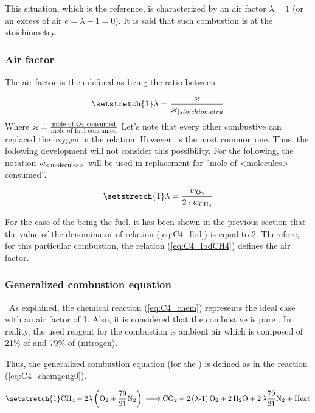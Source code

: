 This situation, which is the reference, is characterized by an air factor \(\lambda = 1\) (or an excess of air \(e=\lambda-1=0\)). It is said that such combustion is at the stoichiometry.

\subsubsection{Air factor}
The air factor is then defined as being the ratio between

\begin{equation}
    \setstretch{1}
    \lambda = \frac{\varkappa}{\varkappa_{\left.\right|stoichiometry}} \label{eq:C4_lbd}
\end{equation}
Where $\varkappa \doteq \frac{\text{mole of \ce{O2} consumed}}{\text{mole of fuel consumed}}$
Let's note that every other combustive can replaced the oxygen in the relation. However,  is the most common one. Thus, the following development will not consider this possibility.
For the following, the notation \(w_{\ce{\text{<molecules>}}}\) will be used in replacement for ''mole of <molecules> consumed''.

\begin{equation}
    \setstretch{1}
    \lambda = \frac{w_{\ce{O2}}}{2\cdot w_{\ce{CH4}}}\label{eq:C4_lbdCH4}
\end{equation}

For the case of the  being the fuel, it has been shown in the previous section that the value of the denominator of relation (\ref{eq:C4_lbd}) is equal to 2. Therefore, for this particular combustion, the relation (\ref{eq:C4_lbdCH4}) defines the air factor.



\subsubsection{Generalized combustion equation}
\quad\ As explained, the chemical reaction (\ref{eq:C4_chem}) represents the ideal case with an air factor of 1. Also, it is considered that the combustive is pure . In reality, the used reagent for the combustion is ambient air which is composed of 21\% of  and 79\% of  (nitrogen).

Thus, the generalized combustion equation (for the ) is defined as in the reaction (\ref{eq:C4_chemgeng0}).

\begin{equation}
    \setstretch{1}
    \ce{CH4 +}2\lambda \left(\ce{O2}+\frac{79}{21}\ce{N2}\right) \ce{-> CO2 + 2(\lambda-1)O2 + 2H2O + 2\lambda\frac{79}{21}N2 + \text{Heat}}\label{eq:C4_chemgeng0}
\end{equation}

